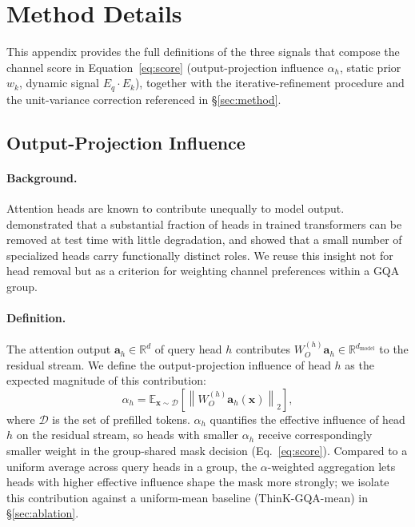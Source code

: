 \documentclass{article}
\begin{document}
 
\section{Method Details}
\label{app:method-details}
 
This appendix provides the full definitions of the three signals that compose the channel score in Equation~\ref{eq:score} (output-projection influence $\alpha_h$, static prior $w_k$, dynamic signal $E_q \cdot E_k$), together with the iterative-refinement procedure and the unit-variance correction referenced in \S\ref{sec:method}.
 
\subsection{Output-Projection Influence}
\label{app:alpha}
 
\paragraph{Background.} Attention heads are known to contribute unequally to model output. \citet{michel2019heads} demonstrated that a substantial fraction of heads in trained transformers can be removed at test time with little degradation, and \citet{voita2019analyzing} showed that a small number of specialized heads carry functionally distinct roles. We reuse this insight not for head removal but as a criterion for weighting channel preferences within a GQA group.
 
\paragraph{Definition.} The attention output $\mathbf{a}_h \in \mathbb{R}^d$ of query head $h$ contributes $W_O^{(h)} \mathbf{a}_h \in \mathbb{R}^{d_{\mathrm{model}}}$ to the residual stream. We define the output-projection influence of head $h$ as the expected magnitude of this contribution:
\begin{equation}
\alpha_h = \mathbb{E}_{\mathbf{x} \sim \mathcal{D}} \left[ \left\| W_O^{(h)} \mathbf{a}_h(\mathbf{x}) \right\|_2 \right],
\label{eq:alpha}
\end{equation}
where $\mathcal{D}$ is the set of prefilled tokens. $\alpha_h$ quantifies the effective influence of head $h$ on the residual stream, so heads with smaller $\alpha_h$ receive correspondingly smaller weight in the group-shared mask decision (Eq.~\ref{eq:score}). Compared to a uniform average across query heads in a group, the $\alpha$-weighted aggregation lets heads with higher effective influence shape the mask more strongly; we isolate this contribution against a uniform-mean baseline (ThinK-GQA-mean) in \S\ref{sec:ablation}.
 
\end{document}
